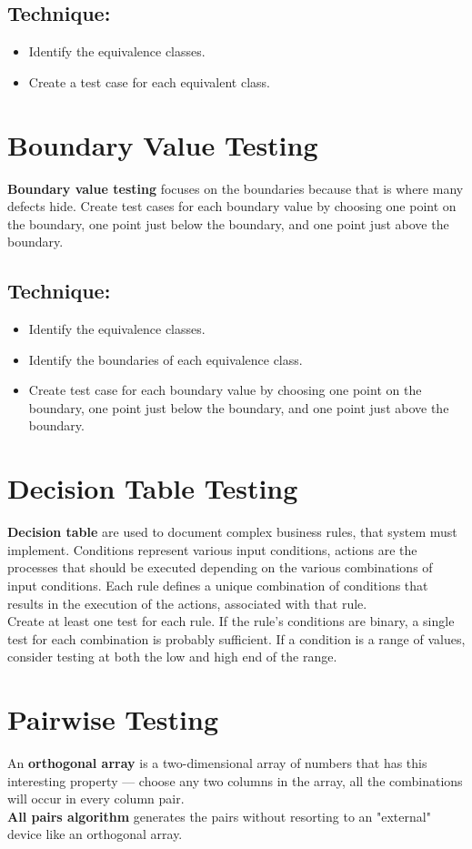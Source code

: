\documentclass{article}
\begin{document}
\subsection*{Technique:}
\begin{itemize}
\item Identify the equivalence classes.
\item Create a test case for each equivalent class.
\end{itemize}

\section*{Boundary Value Testing}
\textbf{Boundary value testing} focuses on the boundaries because that is where many defects hide. Create test cases for each boundary value by choosing one point on the boundary, one point just below the boundary, and one point just above the boundary.
\subsection*{Technique:}
\begin{itemize}
\item Identify the equivalence classes.
\item Identify the boundaries of each equivalence class.
\item Create test case for each boundary value by choosing one point on the boundary, one point just below the boundary, and one point just above the boundary.
\end{itemize}

\section*{Decision Table Testing}
\textbf{Decision table} are used to document complex business rules, that system must implement. Conditions represent various input conditions, actions are the processes that should be executed depending on the various combinations of input conditions. Each rule defines a unique combination of conditions that results in the execution of the actions, associated with that rule. 
\\
Create at least one test for each rule. If the rule's conditions are binary, a single test for each combination is probably sufficient. If a condition is a range of values, consider testing at both the low and high end of the range.

\section*{Pairwise Testing}
An \textbf{orthogonal array} is a two-dimensional array of numbers that has this interesting property --- choose any two columns in the array, all the combinations will occur in every column pair.
\\
\textbf{All pairs algorithm} generates the pairs without resorting to an "external" device like an orthogonal array.
\end{document}
